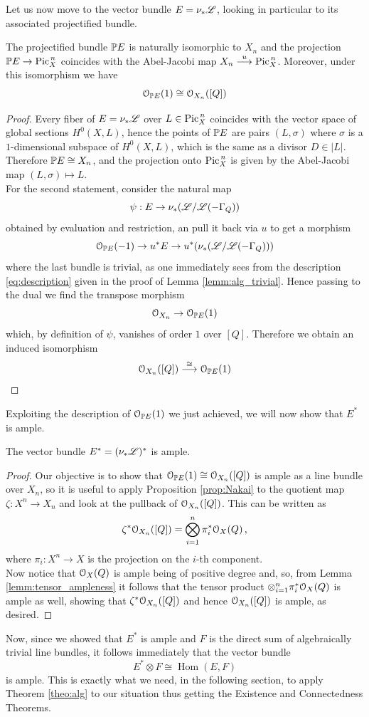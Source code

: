 	Let us now move to the vector bundle $E=\nu_{*} \mathscr{L}$, looking in particular to its associated projectified bundle.
	\begin{prop}
		The projectified bundle $\mathbb{P} E$ is naturally isomorphic to $X_n$ and the projection $\mathbb{P} E \to \operatorname{Pic}^{\,n}_X$ coincides with the Abel-Jacobi map $X_n \overset{u}\longrightarrow \operatorname{Pic}^{\,n}_X$. Moreover, under this isomorphism we have
		$$ \mathcal{O}_{\mathbb{P} E}(1) \cong \mathcal{O}_{X_n}([Q]) $$
	\end{prop}
	\begin{proof}
		Every fiber of $E=\nu_{*}\mathscr{L}$ over $L\in \operatorname{Pic}^{\,n}_X$ coincides with the vector space of global sections $H^0(X,L)$, hence the points of $\mathbb{P} E$ are pairs $(L,\sigma)$ where $\sigma$ is a $1$-dimensional subspace of $H^0(X,L)$, which is the same as a divisor $D\in |L|$. Therefore $\mathbb{P} E \cong X_n$, and the projection onto $\operatorname{Pic}^{\,n}_X$ is given by the Abel-Jacobi map $(L,\sigma) \mapsto L$.\\

		For the second statement, consider the natural map
		$$ \psi: E \to \nu_*(\mathscr{L}/\mathscr{L}(-\Gamma_Q)) $$
		obtained by evaluation and restriction, an pull it back via $u$ to get a morphism
		$$ \mathcal{O}_{\mathbb{P} E}(-1)\to u^* E \to u^*(\nu_*(\mathscr{L}/\mathscr{L}(-\Gamma_Q))) $$
		where the last bundle is trivial, as one immediately sees from the description \ref{eq:description} given in the proof of Lemma \ref{lemm:alg_trivial}. Hence passing to the dual we find the transpose morphism
		$$ \mathcal{O}_{X_n} \to \mathcal{O}_{\mathbb{P} E}(1) $$
		which, by definition of $\psi$, vanishes of order $1$ over $[Q]$. Therefore we obtain an induced isomorphism
		$$\mathcal{O}_{X_n}([Q]) \overset{\cong}\longrightarrow \mathcal{O}_{\mathbb{P} E}(1)$$ 
	\end{proof}
	Exploiting the description of $\mathcal{O}_{\mathbb{P} E}(1)$ we just achieved, we will now show that $E^*$ is ample.
	\begin{prop}
		The vector bundle $E^* = (\nu_{*}\mathscr{L})^*$ is ample.
	\end{prop}
	\begin{proof}
		Our objective is to show that $\mathcal{O}_{\mathbb{P} E}(1)\cong \mathcal{O}_{X_n}([Q])$ is ample as a line bundle over $X_n$, so it is useful to apply Proposition \ref{prop:Nakai} to the quotient map $\zeta:X^n\to X_n$ and look at the pullback of $\mathcal{O}_{X_n}([Q])$. This can be written as
		$$ \zeta^* \mathcal{O}_{X_n}([Q]) = \bigotimes_{i=1}^n \pi_i^* \mathcal{O}_X(Q)\,, $$
		where $\pi_i:X^n\to X$ is the projection on the $i$-th component.\\
		Now notice that $\mathcal{O}_X(Q)$ is ample being of positive degree and, so, from Lemma \ref{lemm:tensor_ampleness} it follows that the tensor product $\otimes_{i=1}^n \pi_i^* \mathcal{O}_X(Q)$ is ample as well, showing that $\zeta^* \mathcal{O}_{X_n}([Q])$ and hence $\mathcal{O}_{X_n}([Q])$ is ample, as desired.
	\end{proof}
	Now, since we showed that $E^*$ is ample and $F$ is the direct sum of algebraically trivial line bundles, it follows immediately that the vector bundle
	$$ E^*\otimes F \cong \operatorname{Hom}(E,F) $$
	is ample. This is exactly what we need, in the following section, to apply Theorem \ref{theo:alg} to our situation thus getting the Existence and Connectedness Theorems.

